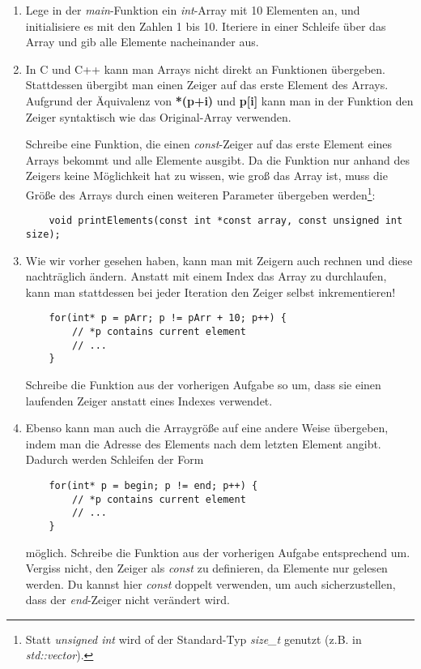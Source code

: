 \documentclass[
  accentcolor=tud1c,	%
  colorbacktitle,		%
  inverttitle,			%
  german,				%
  twoside
]{tudexercise}
\begin{document}
\begin{enumerate}
\item 
Lege in der \emph{main}-Funktion ein \emph{int}-Array mit 10 Elementen an, und initialisiere es mit den Zahlen 1 bis 10.
Iteriere in einer Schleife über das Array und gib alle Elemente nacheinander aus.

\item
In C und C++ kann man Arrays nicht direkt an Funktionen übergeben.
Stattdessen übergibt man einen Zeiger auf das erste Element des Arrays. Aufgrund der Äquivalenz von \textbf{*(p+i) } und \textbf{p[i]} kann man in der Funktion den Zeiger syntaktisch wie das Original-Array verwenden.

Schreibe eine Funktion, die einen \emph{const}-Zeiger auf das erste Element eines Arrays bekommt und alle Elemente ausgibt.
Da die Funktion nur anhand des Zeigers keine Möglichkeit hat zu wissen, wie groß das Array ist, muss die Größe des Arrays durch einen weiteren Parameter übergeben werden\footnote{Statt \emph{unsigned int} wird of der Standard-Typ \emph{size\_t} genutzt (z.B. in \emph{std::vector}).}:
\begin{lstlisting}
	void printElements(const int *const array, const unsigned int size);
\end{lstlisting}

\item
Wie wir vorher gesehen haben, kann man mit Zeigern auch rechnen und diese nachträglich ändern.
Anstatt mit einem Index das Array zu durchlaufen, kann man stattdessen bei jeder Iteration den Zeiger selbst inkrementieren! 

\begin{lstlisting}
	for(int* p = pArr; p != pArr + 10; p++) {
		// *p contains current element
		// ...
	}
\end{lstlisting}

Schreibe die Funktion aus der vorherigen Aufgabe so um, dass sie einen laufenden Zeiger anstatt eines Indexes verwendet.

\item
Ebenso kann man auch die Arraygröße auf eine andere Weise übergeben, indem man  die Adresse des Elements nach dem letzten Element angibt.
Dadurch werden Schleifen der Form
\begin{lstlisting}
	for(int* p = begin; p != end; p++) {
		// *p contains current element
		// ...
	}
\end{lstlisting}

möglich.
Schreibe die Funktion aus der vorherigen Aufgabe entsprechend um.
Vergiss nicht, den Zeiger als \emph{const} zu definieren, da Elemente nur gelesen werden.
Du kannst hier \emph{const} doppelt verwenden, um auch sicherzustellen, dass der \emph{end}-Zeiger nicht verändert wird.


\end{enumerate}
\end{document}
